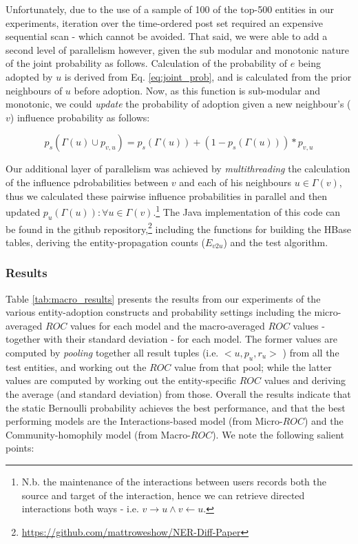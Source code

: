 \documentclass[10pt,journal,compsoc]{IEEEtran}
\begin{document}
Unfortunately, due to the use of a sample of 100 of the top-500 entities in our experiments, iteration over the time-ordered post set required an expensive sequential scan - which cannot be avoided.
That said, we were able to add a second level of parallelism however, given the sub modular and monotonic nature of the joint probability as follows.
Calculation of the probability of $e$ being adopted by $u$ is derived from Eq. \ref{eq:joint_prob}, and is calculated from the prior neighbours of $u$ before adoption.
Now, as this function is sub-modular and monotonic, we could \emph{update} the probability of adoption given a new neighbour's ($v$) influence probability as follows:

\begin{equation}
p_s(\Gamma(u) \cup p_{v,u}) = p_s(\Gamma(u)) + (1 - p_s(\Gamma(u))) * p_{v,u}
\end{equation}

Our additional layer of parallelism was achieved by \emph{multithreading} the calculation of the influence pdrobabilities between $v$ and each of his neighbours $u \in \Gamma(v)$, thus we calculated these pairwise influence probabilities in parallel and then updated $p_u(\Gamma(u)) : \forall u \in \Gamma(v)$.\footnote{N.b. the maintenance of the interactions between users records both the source and target of the interaction, hence we can retrieve directed interactions both ways - i.e. $v \rightarrow u \wedge v \leftarrow u$.}
The Java implementation of this code can be found in the github repository,\footnote{\url{https://github.com/mattroweshow/NER-Diff-Paper}} including the functions for building the HBase tables, deriving the entity-propagation counts ($E_{v2u}$) and the test algorithm.

\subsubsection{Results}
Table \ref{tab:macro_results} presents the results from our experiments of the various entity-adoption constructs and probability settings including the micro-averaged $ROC$ values for each model and the macro-averaged $ROC$ values - together with their standard deviation - for each model.
The former values are computed by \emph{pooling} together all result tuples (i.e. $<u, p_u, r_u>$ ) from all the test entities, and working out the $ROC$ value from that pool; while the latter values are computed by working out the entity-specific $ROC$ values and deriving the average (and standard deviation) from those.
Overall the results indicate that the static Bernoulli probability achieves the best performance, and that the best performing models are the Interactions-based model (from Micro-$ROC$) and the Community-homophily model (from Macro-$ROC$).
We note the following salient points:
\end{document}
